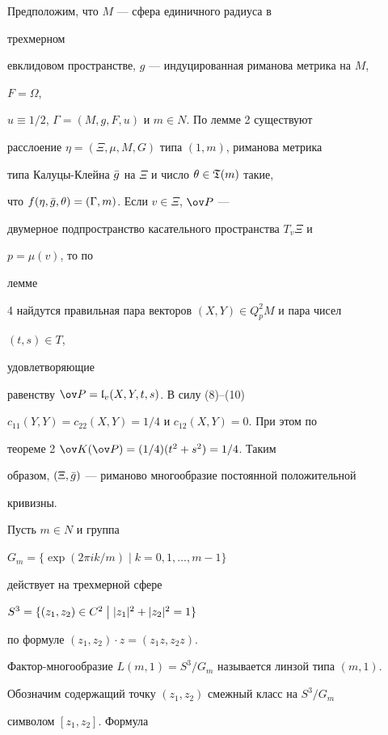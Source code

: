 \begin{exam} Предположим, что $M$ --- сфера единичного радиуса в 


трехмерном 


евклидовом пространстве, $g$ --- индуцированная риманова метрика на $M$, 


$F=\Omega$, 


$u\equiv 1/2$, $\Gamma=(M,g,F,u)$ и $m\in N$. По лемме 2 существуют 


расслоение $\eta=(\Xi,\mu,M,G)$ типа $(1,m)$, риманова метрика 


типа Калуцы-Клейна $\Bar g$ на $\Xi$ и число $\theta\in\frak T(m)$ такие, 


что $f(\eta,\Bar g,\theta)=(\Gamma,m)$. Если $v\in\Xi$, $\ov P$ --- 


двумерное подпространство касательного пространства $T_v\Xi$ и 


$p=\mu(v)$, то по 


лемме 


4 найдутся правильная пара векторов $(X,Y)\in Q^2_pM$ и пара чисел 


$(t,s)\in T$, 


удовлетворяющие 


равенству $\ov P=\frak l_v(X,Y,t,s)$. В силу (8)--(10) 


$c_{11}(Y,Y)=c_{22}(X,Y)=1/4$ и $c_{12}(X,Y)=0$. При этом по 


теореме 2 $\ov K(\ov P)=(1/4)(t^2+s^2)=1/4$. Таким 


образом, $(\Xi,\Bar g)$ --- риманово многообразие постоянной положительной 


кривизны. 


\end{exam} 


 


Пусть $m\in N$ и группа 


$G_m=\{\exp(2\pi ik/m)\mid k=0,1,\dotsc,m-1\}$ 


действует на трехмерной сфере 


$S^3=\{(z_1,z_2)\in C^2\bigm|{}|z_1|^2+|z_2|^2=1\}$ 


по формуле $(z_1,z_2)\cdot z=(z_1z,z_2z)$. 


Фактор-многообразие $L(m,1)=S^3/G_m$ называется линзой типа $(m,1)$. 


Обозначим содержащий точку $(z_1,z_2)$ смежный класс на $S^3/G_m$ 


символом $[z_1,z_2]$. Формула 


